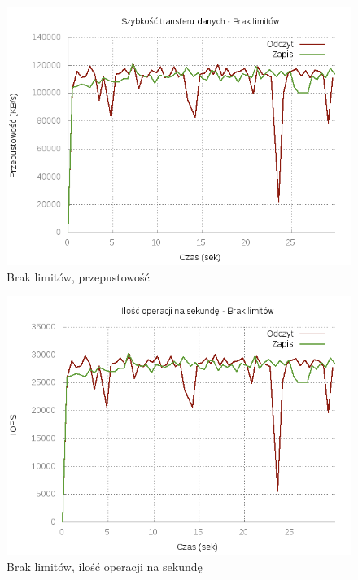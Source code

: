 \begin{figure}[h]
	\centering
	\includegraphics[scale=0.9]{results/Unlimited_bw.png}
		\caption{Brak limitów, przepustowość}
    \label{fig:unlimited-bw}
\end{figure}
\begin{figure}[h]
	\centering
	\includegraphics[scale=0.9]{results/Unlimited_iops.png}
		\caption{Brak limitów, ilość operacji na sekundę}
    \label{fig:unlimited-iops}
\end{figure}
